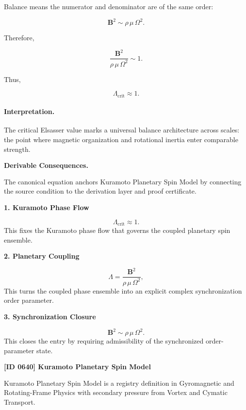 Balance means the numerator and denominator are of the same order:

\begin{equation}
\mathbf{B}^2
\sim
\rho\,\mu\,\Omega^2 .
\end{equation}

Therefore,

\begin{equation}
\frac{\mathbf{B}^2}
{\rho\,\mu\,\Omega^2}
\sim
1 .
\end{equation}

Thus,

\begin{equation}
\boxed{
\Lambda_{\mathrm{crit}}\approx 1 .
}
\end{equation}

\paragraph{Interpretation.}
The critical Elsasser value marks a universal balance architecture across scales: the point where magnetic organization and rotational inertia enter comparable strength.

\par\vspace{0.35em}
\noindent\textbf{Derivable Consequences.}\quad
\begingroup
\footnotesize
\raggedright
The canonical equation anchors Kuramoto Planetary Spin Model by connecting the source condition to the derivation layer and proof certificate.
\par\endgroup

\noindent\textbf{1. Kuramoto Phase Flow}\par
\[
\Lambda_{\mathrm{crit}}\approx 1.
\]
\noindent This fixes the Kuramoto phase flow that governs the coupled planetary spin ensemble.\par
\noindent\textbf{2. Planetary Coupling}\par
\[
\Lambda = \frac{\mathbf{B}^2} {\rho\,\mu\,\Omega^2},
\]
\noindent This turns the coupled phase ensemble into an explicit complex synchronization order parameter.\par
\noindent\textbf{3. Synchronization Closure}\par
\[
\mathbf{B}^2 \sim \rho\,\mu\,\Omega^2.
\]
\noindent This closes the entry by requiring admissibility of the synchronized order-parameter state.\par

\clearpage
\noindent\textbf{[ID 0640] Kuramoto Planetary Spin Model}\par
\vspace{0.35em}
\begingroup\small
{}
Kuramoto Planetary Spin Model is a registry definition in Gyromagnetic and Rotating-Frame Physics with secondary pressure from Vortex and Cymatic Transport.

